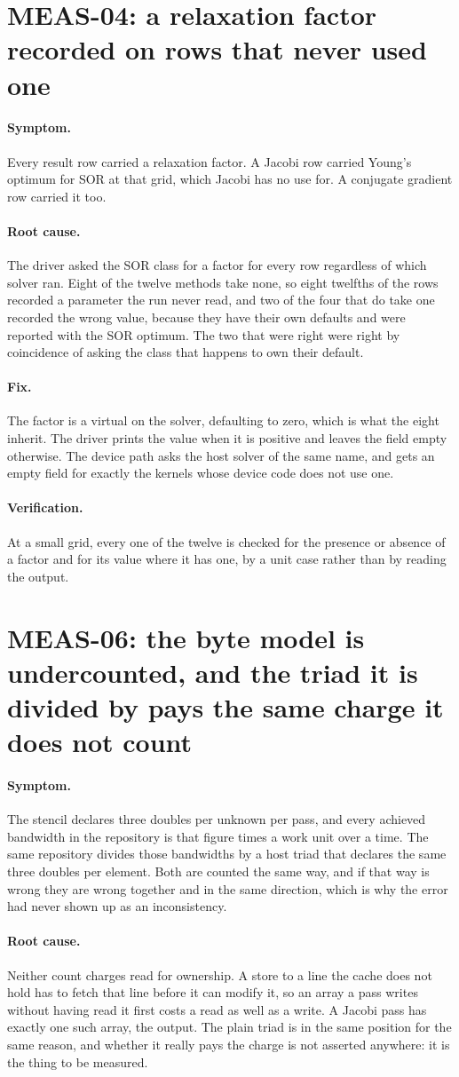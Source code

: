 \documentclass[11pt,a4paper]{report}
\newcommand{\symptom}[1]{\paragraph{Symptom.}#1}
\newcommand{\rootcause}[1]{\paragraph{Root cause.}#1}
\newcommand{\fix}[1]{\paragraph{Fix.}#1}
\newcommand{\verification}[1]{\paragraph{Verification.}#1}
\begin{document}
\section{MEAS-04: a relaxation factor recorded on rows that never used one}

\symptom{Every result row carried a relaxation factor. A Jacobi row carried
Young's optimum for SOR at that grid, which Jacobi has no use for. A conjugate
gradient row carried it too.}

\rootcause{The driver asked the SOR class for a factor for every row regardless
of which solver ran. Eight of the twelve methods take none, so eight twelfths of
the rows recorded a parameter the run never read, and two of the four that do
take one recorded the wrong value, because they have their own defaults and were
reported with the SOR optimum. The two that were right were right by coincidence
of asking the class that happens to own their default.}

\fix{The factor is a virtual on the solver, defaulting to zero, which is what the
eight inherit. The driver prints the value when it is positive and leaves the
field empty otherwise. The device path asks the host solver of the same name, and
gets an empty field for exactly the kernels whose device code does not use one.}

\verification{At a small grid, every one of the twelve is checked for the presence
or absence of a factor and for its value where it has one, by a unit case rather
than by reading the output.}

\section{MEAS-06: the byte model is undercounted, and the triad it is divided by pays the same charge it does not count}

\symptom{The stencil declares three doubles per unknown per pass, and every
achieved bandwidth in the repository is that figure times a work unit over a
time. The same repository divides those bandwidths by a host triad that declares
the same three doubles per element. Both are counted the same way, and if that
way is wrong they are wrong together and in the same direction, which is why the
error had never shown up as an inconsistency.}

\rootcause{Neither count charges read for ownership. A store to a line the cache
does not hold has to fetch that line before it can modify it, so an array a pass
writes without having read it first costs a read as well as a write. A Jacobi
pass has exactly one such array, the output. The plain triad is in the same
position for the same reason, and whether it really pays the charge is not
asserted anywhere: it is the thing to be measured.}
\end{document}
